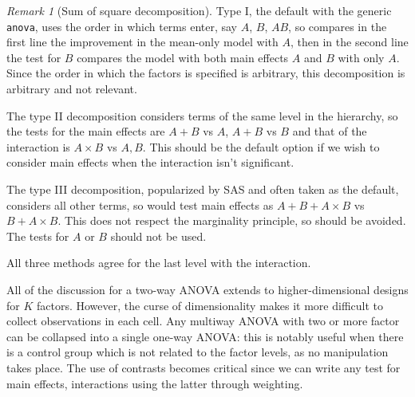 \documentclass[
  11pt,
  letterpaper,
]{scrbook}
\theoremstyle{plain}
\theoremstyle{definition}
\theoremstyle{definition}
\theoremstyle{plain}
\theoremstyle{remark}
\newtheorem{refremark}{Remark}[chapter]
\begin{document}
\begin{refremark}[Sum of square decomposition]
Type I, the default with the generic \texttt{anova}, uses the order in
which terms enter, say \(A\), \(B\), \(AB\), so compares in the first
line the improvement in the mean-only model with \(A\), then in the
second line the test for \(B\) compares the model with both main effects
\(A\) and \(B\) with only \(A\). Since the order in which the factors is
specified is arbitrary, this decomposition is arbitrary and not
relevant.

The type II decomposition considers terms of the same level in the
hierarchy, so the tests for the main effects are \(A + B\) vs \(A\),
\(A+B\) vs \(B\) and that of the interaction is \(A\times B\) vs
\(A, B\). This should be the default option if we wish to consider main
effects when the interaction isn't significant.

The type III decomposition, popularized by SAS and often taken as the
default, considers all other terms, so would test main effects as
\(A + B + A\times B\) vs \(B + A\times B\). This does not respect the
marginality principle, so should be avoided. The tests for \(A\) or
\(B\) should not be used.

All three methods agree for the last level with the interaction.

\label{rem-sumofsquare}

\end{refremark}

All of the discussion for a two-way ANOVA extends to higher-dimensional
designs for \(K\) factors. However, the curse of dimensionality makes it
more difficult to collect observations in each cell. Any multiway ANOVA
with two or more factor can be collapsed into a single one-way ANOVA:
this is notably useful when there is a control group which is not
related to the factor levels, as no manipulation takes place. The use of
contrasts becomes critical since we can write any test for main effects,
interactions using the latter through weighting.
\end{document}
